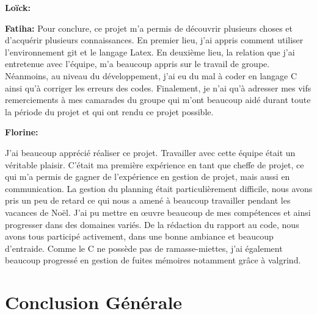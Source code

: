 \documentclass{article}
\begin{document}
\textbf{Loïck:}

\medskip

\textbf{Fatiha:}
Pour conclure, ce projet m’a permis de découvrir plusieurs choses et d’acquérir plusieurs connaissances.
En premier lieu, j’ai appris comment utiliser l’environnement git et le langage Latex.
En deuxième lieu, la relation que j’ai entretenue avec l’équipe, m’a beaucoup appris sur le travail de groupe.
Néanmoins, au niveau du développement, j’ai eu du mal à coder en langage C ainsi qu'à corriger les erreurs des codes. Finalement, je n’ai qu’à adresser mes vifs remerciements à mes camarades du groupe qui m’ont beaucoup aidé durant toute la période du projet et qui ont rendu ce projet possible.
\medskip

\textbf{Florine:}

J'ai beaucoup apprécié réaliser ce projet. Travailler avec cette équipe était un véritable plaisir. C'était ma première expérience en tant que cheffe de projet, ce qui m'a permis de gagner de l'expérience en gestion de projet, mais aussi en communication. La gestion du planning était particulièrement difficile, nous avons pris un peu de retard ce qui nous a amené à beaucoup travailler pendant les vacances de Noël. 
J'ai pu mettre en œuvre beaucoup de mes compétences et ainsi progresser dans des domaines variés. De la rédaction du rapport au code, nous avons tous participé activement, dans une bonne ambiance et beaucoup d'entraide.
Comme le C ne possède pas de ramasse-miettes, j'ai également beaucoup progressé en gestion de fuites mémoires notamment grâce à valgrind.
\medskip

\clearpage
\section{Conclusion Générale}
\end{document}
